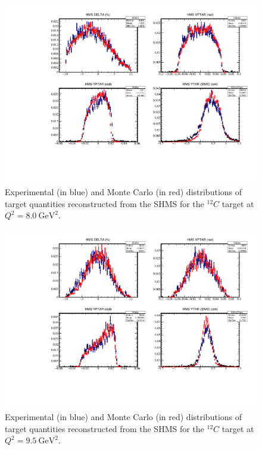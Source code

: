 \begin{figure}[!h]
    \centering
    \includegraphics[page=2,width=1.0\textwidth]{pass5_report/Report_c12_8.pdf}
    \caption{
            Experimental (in blue) and Monte Carlo (in red) distributions of
            target quantities reconstructed from the SHMS for
            the ${}^{12}C$ target at $Q^2=\SI{8.0}{\giga\electronvolt\squared}$.
            }
    \label{fig:Report_c12_8.pdf}
\end{figure}


\begin{figure}[!h]
    \centering
    \includegraphics[page=2,width=1.0\textwidth]{pass5_report/Report_c95.pdf}
    \caption{
            Experimental (in blue) and Monte Carlo (in red) distributions of
            target quantities reconstructed from the SHMS for
            the ${}^{12}C$ target at $Q^2=\SI{9.5}{\giga\electronvolt\squared}$.
            }
    \label{fig:Report_c95.pdf}
\end{figure}


